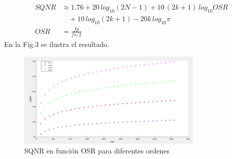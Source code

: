 \documentclass[a4paper,conference]{IEEEtran}
\begin{document}
\begin{align}
SQNR &\approx 1.76+20\,log_{10}(2N-1)+10\,(2k+1)\,log_{10}OSR\nonumber\\
&\quad
+10\,log_{10}(2k+1)-20k\,log_{10}\pi \\
OSR&=\frac{fp}{fs/2}
\end{align}
En la Fig.3 se ilustra el resultado.
\begin{figure}[!t]
\centering
\includegraphics[height=1.8in]{SQNR_ideal_segun_OSR}
%
\caption{SQNR en funci\'on OSR para diferentes ordenes}
\label{fig_3}
\end{figure}


%
%
\end{document}
